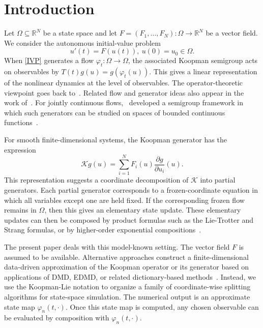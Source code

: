 \documentclass[preprint,1p,times,nopreprintline]{elsarticle}
\begin{document}


\section{Introduction}
\label{sec:introduction}

Let $\Omega\subseteq \mathbb{R}^N$ be a state space and let $F=(F_1,\ldots,F_N):\Omega\to\mathbb{R}^N$ be a vector field. We consider the autonomous initial-value problem
\begin{equation}
\label{IVP}
u'(t)=F(u(t)),
~
u(0)=u_0\in\Omega .
\end{equation}
When \eqref{IVP} generates a flow $\varphi_t:\Omega\to\Omega$, the associated Koopman semigroup acts on observables by $T(t)g(u)=g(\varphi_t(u))$. This gives a linear representation of the nonlinear dynamics at the level of observables. The operator-theoretic viewpoint goes back to~\citet{Koopman2,Koopman1}. Related flow and generator ideas also appear in the work of~\citet{New62,New61}. For jointly continuous flows,~\citet{JD1,JD2} developed a semigroup framework in which such generators can be studied on spaces of bounded continuous functions~\citep{JD1,JD2}.

For smooth finite-dimensional systems, the Koopman generator has the expression
\[
\mathcal{K}g(u)
=
\sum_{i=1}^N F_i(u)\frac{\partial g}{\partial u_i}(u).
\]
This representation suggests a coordinate decomposition of $\mathcal{K}$ into partial generators. Each partial generator corresponds to a frozen-coordinate equation in which all variables except one are held fixed. If the corresponding frozen flow remains in $\Omega$, then this gives an elementary state update. These elementary updates can then be composed by product formulas such as the Lie-Trotter and Strang formulas, or by higher-order exponential compositions~\citep{KHH1,strang1968construction,chorin1978product,JD5,JD6,JD7}.

The present paper deals with this model-known setting. The vector field $F$ is assumed to be available. Alternative approaches construct a finite-dimensional data-driven approximation of the Koopman operator or its generator based on applications of DMD, EDMD, or related dictionary-based methods~\citep{379schmid2010dynamic,366rowley2009spectral,227kutz2016dynamic,EDMD2}. Instead, we use the Koopman-Lie notation to organize a family of coordinate-wise splitting algorithms for state-space simulation. The numerical output is an approximate state map $\varphi_n(t,\cdot)$. Once this state map is computed, any chosen observable can be evaluated by composition with $\varphi_n(t,\cdot)$.
\end{document}
